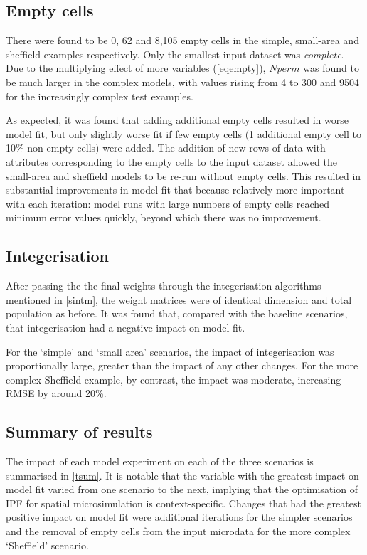 \documentclass[a4paper,10pt]{article}
\begin{document}
\subsection{Empty cells}

There were found to be 0, 62 and 8,105 empty cells in the simple, small-area and sheffield
examples respectively. Only the smallest input dataset was
\emph{complete}. Due to the multiplying effect of more variables (\cref{eqempty}),
$Nperm$ was found to be much larger in the complex models, with values rising from
4 to 300 and 9504 for the increasingly complex test examples. 

As expected, it was found that adding additional empty cells
resulted in worse model fit, but only slightly worse fit if few empty
cells (1 additional empty cell to 10\% non-empty cells) were added.
The addition of new rows of data with attributes corresponding
to the empty cells to the input dataset allowed the small-area and sheffield
models to be re-run without empty cells. This resulted in substantial improvements in
model fit that because relatively more important with each iteration: model
runs with large numbers of empty cells reached minimum error values quickly, beyond
which there was no improvement.

\subsection{Integerisation}

After passing the the final weights through the integerisation algorithms mentioned
in \cref{sintm}, the weight matrices were of identical dimension and total population as
before. It was found that, compared with the baseline scenarios, that integerisation
had a negative impact on model fit.

For the `simple' and `small area' scenarios, the impact of integerisation was proportionally
large, greater than the impact of any other changes. For the more complex Sheffield example,
by contrast, the impact was moderate, increasing RMSE by around 20\%.

\subsection{Summary of results}

The impact of each model experiment on each of the three scenarios
is summarised in \cref{tsum}. It is notable that the variable with the
greatest impact on model fit varied from one scenario to the next,
implying that the optimisation of IPF for spatial microsimulation is
context-specific. Changes that had the greatest positive impact on model
fit were additional iterations for the simpler scenarios and the removal of
empty cells from the input microdata for the more complex `Sheffield' scenario.
\end{document}
